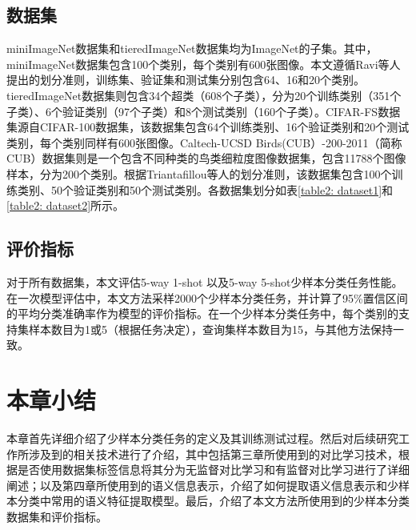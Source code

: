 \subsection[\hspace{-2pt}数据集]{{\heiti{} \hspace{-8pt}数据集}}\label{section2: 数据集}

miniImageNet数据集\cite{vinyals2016matching}和tieredImageNet数据集\cite{ren2018meta}均为ImageNet\cite{deng2009imagenet}的子集。其中，miniImageNet数据集包含100个类别，每个类别有600张图像。本文遵循Ravi等人\cite{optimization}提出的划分准则，训练集、验证集和测试集分别包含64、16和20个类别。tieredImageNet数据集则包含34个超类（608个子类），分为20个训练类别（351个子类）、6个验证类别（97个子类）和8个测试类别（160个子类）。CIFAR-FS数据集\cite{bertinetto2019meta}源自CIFAR-100数据集，该数据集包含64个训练类别、16个验证类别和20个测试类别，每个类别同样有600张图像。Caltech-UCSD Birds(CUB）-200-2011（简称CUB）数据集\cite{wah2011caltech}则是一个包含不同种类的鸟类细粒度图像数据集，包含11788个图像样本，分为200个类别。根据Triantafillou等人\cite{triantafillou2017few}的划分准则，该数据集包含100个训练类别、50个验证类别和50个测试类别。各数据集划分如表\ref{table2: dataset1}和\ref{table2: dataset2}所示。

\subsection[\hspace{-2pt}评价指标]{{\heiti{} \hspace{-8pt}评价指标}}\label{section2: 评价指标}

对于所有数据集，本文评估5-way 1-shot 以及5-way 5-shot少样本分类任务性能。在一次模型评估中，本文方法采样2000个少样本分类任务，并计算了95\%置信区间的平均分类准确率作为模型的评价指标。在一个少样本分类任务中，每个类别的支持集样本数目为1或5（根据任务决定），查询集样本数目为15，与其他方法\cite{RFS, IER}保持一致。

\section[\hspace{-2pt}本章小结]{{\heiti{} \hspace{-8pt}本章小结}}\label{section2: 本章小结}

本章首先详细介绍了少样本分类任务的定义及其训练测试过程。然后对后续研究工作所涉及到的相关技术进行了介绍，其中包括第三章所使用到的对比学习技术，根据是否使用数据集标签信息将其分为无监督对比学习和有监督对比学习进行了详细阐述；以及第四章所使用到的语义信息表示，介绍了如何提取语义信息表示和少样本分类中常用的语义特征提取模型。最后，介绍了本文方法所使用到的少样本分类数据集和评价指标。
